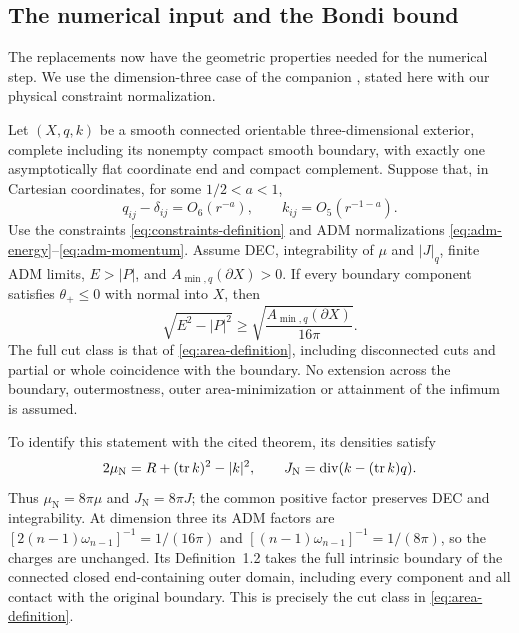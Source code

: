 \subsection{The numerical input and the Bondi bound}\label{sec:companion-input}
The replacements now have the geometric properties needed for the
numerical step. We use the dimension-three case of the companion
\cite[Definitions~1.1--1.2 and Theorem~1.3]{NumericalPenrose}, stated
here with our physical constraint normalization.

\begin{theorem}
\label{ass:af}
Let $(X,q,k)$ be a smooth connected orientable three-dimensional
exterior, complete including its nonempty compact smooth boundary,
with exactly one asymptotically flat coordinate end and compact
complement. Suppose that, in Cartesian coordinates, for some
$1/2<a<1$,
\[
 q_{ij}-\delta_{ij}=O_6(r^{-a}),\qquad
 k_{ij}=O_5(r^{-1-a}).
\]
Use the constraints \eqref{eq:constraints-definition} and ADM
normalizations \eqref{eq:adm-energy}--\eqref{eq:adm-momentum}.
Assume DEC, integrability of $\mu$ and $|J|_q$, finite ADM limits,
$E>|P|$, and $A_{\min,q}(\partial X)>0$. If every boundary component
satisfies $\theta_+\leq0$ with normal into $X$, then
\[
 \sqrt{E^2-|P|^2}\geq
 \sqrt{\frac{A_{\min,q}(\partial X)}{16\pi}}.
\]
The full cut class is that of \eqref{eq:area-definition}, including
disconnected cuts and partial or whole coincidence with the boundary.
No extension across the boundary, outermostness, outer
area-minimization or attainment of the infimum is assumed.
\end{theorem}

To identify this statement with the cited theorem, its densities satisfy
\[
 2\mu_{\mathrm N}=R+(\operatorname{tr} k)^2-|k|^2,\qquad
 J_{\mathrm N}=\operatorname{div}(k-(\operatorname{tr} k)q).
\]
Thus $\mu_{\mathrm N}=8\pi\mu$ and $J_{\mathrm N}=8\pi J$;
the common positive factor preserves DEC and integrability. At
dimension three its ADM factors are
$[2(n-1)\omega_{n-1}]^{-1}=1/(16\pi)$ and
$[(n-1)\omega_{n-1}]^{-1}=1/(8\pi)$, so the charges are unchanged.
Its Definition~1.2 takes the full intrinsic boundary of the connected
closed end-containing outer domain, including every component and
all contact with the original boundary. This is precisely the cut
class in \eqref{eq:area-definition}.

